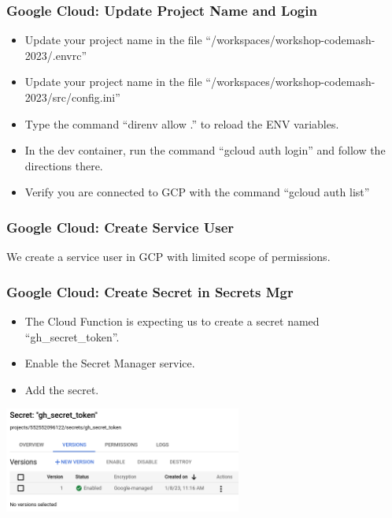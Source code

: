 \documentclass[aspectratio=169]{beamer}
\begin{document}
\begin{frame}
	\frametitle{Google Cloud: Update Project Name and Login}
	\begin{itemize}
		\item Update your project name in the file ``/workspaces/workshop-codemash-2023/.envrc''
		\item Update your project name in the file ``/workspaces/workshop-codemash-2023/src/config.ini''
		\item Type the command ``direnv allow .'' to reload the ENV variables.
		\item In the dev container, run the command ``gcloud auth login'' and follow the directions there.
		\item Verify you are connected to GCP with the command ``gcloud auth list''
	\end{itemize}
\end{frame}

\begin{frame}
	\frametitle{Google Cloud: Create Service User}

	We create a service user in GCP with limited scope of permissions.



\end{frame}

\begin{frame}
	\frametitle{Google Cloud: Create Secret in Secrets Mgr}

	\begin{itemize}
		\item The Cloud Function is expecting us to create a secret named ``gh\_secret\_token''.
		\item Enable the Secret Manager service.
		\item Add the secret.
	\end{itemize}
	\begin{center}
		\includegraphics[width=0.585\textwidth]{../images/gcp-secret.png}
	\end{center}
\end{frame}
\end{document}
